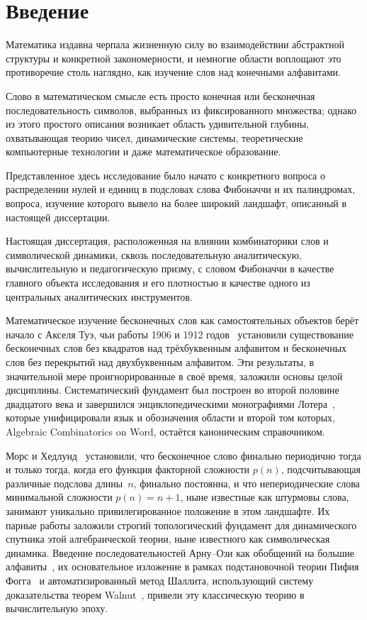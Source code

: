 \documentclass[a4paper,14pt]{extreport}
\theoremstyle{plain}
\theoremstyle{definition}
\theoremstyle{remark}
\begin{document}
	\chapter*{Введение}
	
	Математика издавна черпала жизненную силу во взаимодействии абстрактной структуры и конкретной закономерности, и немногие области воплощают это противоречие столь наглядно, как изучение слов над конечными алфавитами.  
	
	Слово в математическом смысле есть просто конечная или бесконечная последовательность символов, выбранных из фиксированного множества; однако из этого простого описания возникает область удивительной глубины, охватывающая теорию чисел, динамические системы, теоретические компьютерные технологии и даже математическое образование.
	
	Представленное здесь исследование было начато с конкретного вопроса о распределении нулей и единиц в подсловах слова Фибоначчи и их палиндромах, вопроса, изучение которого вывело на 
	более широкий ландшафт, описанный в настоящей диссертации.
	
	Настоящая диссертация, расположенная на влиянии комбинаторики слов и символической динамики, сквозь последовательную аналитическую, вычислительную и педагогическую призму, с словом Фибоначчи в качестве главного объекта исследования и его плотностью в качестве одного из центральных аналитических инструментов.
	
	Математическое изучение бесконечных слов как самостоятельных объектов берёт начало с Акселя Туэ, чьи работы 1906 и 1912 годов~\cite{Thue, Thue1912} установили существование бесконечных слов без квадратов над трёхбуквенным алфавитом и бесконечных слов без перекрытий над двухбуквенным алфавитом. Эти результаты, в значительной мере проигнорированные в своё время, заложили основы целой дисциплины. Систематический фундамент был построен во второй половине двадцатого века и завершился энциклопедическими монографиями Лотера~\cite{Lothaire1983, Lothaire2002},
	которые унифицировали язык и обозначения области и второй том которых, Algebraic Combinatorics on Word, остаётся каноническим справочником.
	
	Морс и Хедлунд~\cite{Morse, Morse1940} установили, что бесконечное слово финально периодично тогда и только тогда, когда его функция факторной сложности $p(n)$, подсчитывающая различные подслова длины~$n$, финально постоянна, и что непериодические слова минимальной сложности $p(n) = n+1$, ныне известные как штурмовы слова, занимают уникально привилегированное положение в этом ландшафте. Их парные работы заложили строгий топологический фундамент для динамического спутника этой алгебраической теории, ныне известного как символическая динамика. Введение последовательностей Арну--Ози как обобщений на большие алфавиты~\cite{Arnoux}, их основательное изложение в рамках подстановочной теории Пифия Фогга~\cite{Fogg} и автоматизированный метод Шаллита, использующий систему доказательства теорем Walnut~\cite{Shallit2022}, привели эту классическую теорию в вычислительную эпоху.
	
\end{document}
